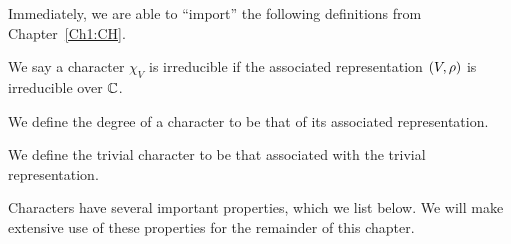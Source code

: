 Immediately, we are able to ``import'' the following definitions from Chapter~\ref{Ch1:CH}.

\begin{definition}[Irreducibility]
    We say a character $\chi_V$ is irreducible if the associated representation $\left( V, \rho \right)$ is irreducible over $\mathbb{C}$.
\end{definition}

\begin{definition}[Degree]
    We define the degree of a character to be that of its associated representation.
\end{definition}

\begin{definition}
    We define the trivial character to be that associated with the trivial representation.
\end{definition}

Characters have several important properties, which we list below. We will make extensive use of these properties for the remainder of this chapter.

